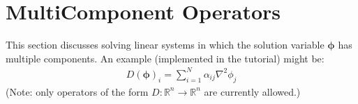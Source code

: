 \documentclass[letterpaper,10pt,english]{sphinxmanual}
\begin{document}
\section{Multi\sphinxhyphen{}Component Operators}
\label{\detokenize{LinearSolvers:multi-component-operators}}
\sphinxAtStartPar
This section discusses solving linear systems in which the solution variable \(\mathbf{\phi}\) has multiple components.
An example (implemented in the  tutorial) might be:
\begin{equation*}
\begin{split}D(\mathbf{\phi})_i = \sum_{i=1}^N \alpha_{ij} \nabla^2 \phi_j\end{split}
\end{equation*}
\sphinxAtStartPar
(Note: only operators of the form \(D:\mathbb{R}^n\to\mathbb{R}^n\) are currently allowed.)
\end{document}
